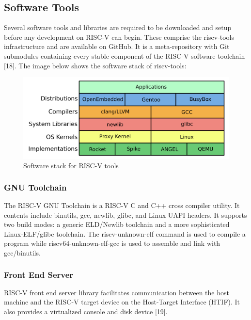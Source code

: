 \subsection{Software Tools}
 \label{sect6_2_1}
Several software tools and libraries are required to be downloaded and setup before any development on RISC-V can begin. These comprise the riscv-tools infrastructure and are available on GitHub. It is a meta-repository with Git submodules containing every stable component of the RISC-V software toolchain [18]. The image below shows the software stack of riscv-tools: \newline\newline
\begin{figure}[h!]
\includegraphics[width=\linewidth]{figures/RISC-V_Software_Stack.png}
\caption{Software stack for RISC-V tools}
\label{fig:riscv2}
\end{figure}

\subsubsection{GNU Toolchain}
 \label{sect6_2_1_1}
The RISC-V GNU Toolchain is a RISC-V C and C++ cross compiler utility. It contents include binutils, gcc, newlib, glibc, and Linux UAPI headers. It supports two build modes: a generic ELD/Newlib toolchain and a more sophisticated Linux-ELF/glibc toolchain. The riscv-unknown-elf command is used to compile a program while riscv64-unknown-elf-gcc is used to assemble and link with gcc/binutils.

\subsubsection{Front End Server}
 \label{sect6_2_1_2}
RISC-V front end server library facilitates communication between the host machine and the RISC-V target device on the Host-Target Interface (HTIF). It also provides a virtualized console and disk device [19]. 

